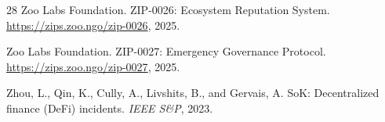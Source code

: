 \documentclass[11pt,letterpaper]{article}
\begin{document}
\begin{thebibliography}{28}
Zoo Labs Foundation.
\newblock ZIP-0026: Ecosystem Reputation System.
\newblock \url{https://zips.zoo.ngo/zip-0026}, 2025.

Zoo Labs Foundation.
\newblock ZIP-0027: Emergency Governance Protocol.
\newblock \url{https://zips.zoo.ngo/zip-0027}, 2025.

Zhou, L., Qin, K., Cully, A., Livshits, B., and Gervais, A.
\newblock SoK: Decentralized finance (DeFi) incidents.
\newblock \emph{IEEE S\&P}, 2023.

\end{thebibliography}
\end{document}
